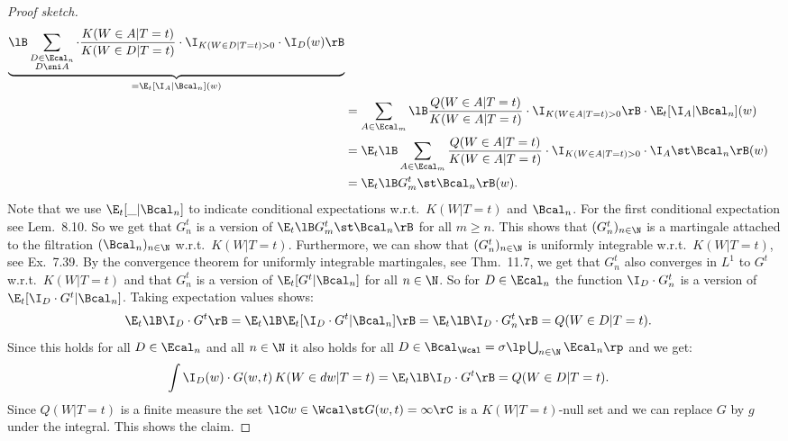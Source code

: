 \begin{Thm}
\begin{proof}[Proof sketch]
\begin{align*}
             \underbrace{ \lB \sum_{\substack{D \in \Ecal_n\\ D \sni A}}  \cdot\frac{K(W \in A|T=t)}{K(W \in D|T=t)}\cdot  \I_{K(W \in D|T=t)>0}   \cdot \I_D(w)\rB }_{=\E_t[\I_A|\Bcal_n](w)}  \\
             &= \sum_{A \in \Ecal_m} \lB \frac{Q(W \in A|T=t)}{K(W \in A|T=t)}  \cdot  \I_{K(W \in A|T=t)>0} \rB \cdot \E_t[\I_A|\Bcal_n](w) \\ 
             &= \E_t\lB \sum_{A \in \Ecal_m} \frac{Q(W \in A|T=t)}{K(W \in A|T=t)} \cdot  \I_{K(W \in A|T=t)>0} \cdot \I_A \st \Bcal_n\rB(w) \\ 
             &= \E_t\lB G_m^t \st \Bcal_n\rB(w).
    \end{align*}
    Note that we use $\E_t[\_|\Bcal_n]$ to indicate conditional expectations w.r.t.\ $K(W|T=t)$ and $\Bcal_n$.
    For the first conditional expectation see \cite{Kle20} Lem.\ 8.10. 
    So we get that $G_n^t$ is a version of $\E_t\lB G_m^t \st \Bcal_n\rB$ for all $m \ge n$.
    This shows that $(G_n^t)_{n \in \N}$ is a martingale attached to the filtration $(\Bcal_n)_{n \in \N}$ w.r.t.\ $K(W|T=t)$.
    Furthermore, we can show that $(G_n^t)_{n \in \N}$ is uniformly integrable w.r.t.\ $K(W|T=t)$, see \cite{Kle20} Ex.\ 7.39.
    By the convergence theorem for uniformly integrable martingales, see \cite{Kle20} Thm.\ 11.7, we get that
    $G_n^t$ also converges in $L^1$ to $G^t$ w.r.t.\ $K(W|T=t)$ and that $G_n^t$ is a version of $\E_t[G^t|\Bcal_n]$ for all $n \in \N$. So for $D \in \Ecal_n$ the function $\I_D \cdot G_n^t$ is a version of $\E_t[\I_D \cdot G^t|\Bcal_n]$.
    Taking expectation values shows:
    \begin{align*}
        \E_t\lB \I_D \cdot G^t  \rB & = \E_t\lB\E_t[ \I_D \cdot G^t|\Bcal_n] \rB  
        = \E_t\lB \I_D \cdot G^t_n  \rB 
        = Q(W \in D|T=t). 
    \end{align*}
    Since this holds for all $D \in \Ecal_n$ and all $n \in \N$ it also holds for all
    $D \in \Bcal_\Wcal=\sigma\lp \bigcup_{n \in \N} \Ecal_n\rp$ and we get:
    \begin{align*}
        \int \I_D(w) \cdot G(w,t) \, K(W \in dw|T=t) &=
        \E_t\lB \I_D \cdot G^t \rB    = Q(W \in D|T=t). 
    \end{align*}
    Since $Q(W|T=t)$ is a finite measure the set $\lC w \in \Wcal \st G(w,t) = \infty \rC$ is a $K(W|T=t)$-null set
    and we can replace $G$ by $g$ under the integral.
    This shows the claim.
  \end{proof}
\end{Thm}

